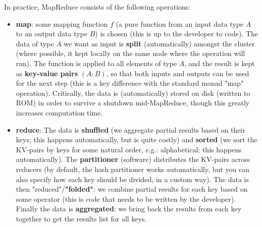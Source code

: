 \documentclass{article}
\begin{document}
\begin{itemize}
	In practice, MapReduce consists of the following operations:
	\begin{itemize}
		\item \textbf{map}: some mapping function $f$ (a pure function from an input data type $A$ to an output data type $B$) is chosen (this is up to the developer to code). The data of type $A$ we want as input is \textbf{split} (automatically) amongst the cluster (where possible, it kept locally on the same node where the operation will run). The function is applied to all elements of type $A$, and the result is kept as \textbf{key-value pairs} $(A : B)$, so that both inputs and outputs can be used for the next step (this is a key difference with the standard monad "map" operation). Critically, the data is (automatically) stored on disk (written to ROM) in order to survive a shutdown mid-MapReduce, though this greatly increases computation time.

		\item \textbf{reduce}: The data is \textbf{shuffled} (we aggregate partial results based on their keys; this happens automatically, but is quite costly) and \textbf{sorted} (we sort the KV-pairs by keys for some natural order, e.g.: alphabetical; this happens automatically). The \textbf{partitioner} (software) distributes the KV-pairs across reducers (by default, the hash partitioner works automatically, but you can also specify how each key should be divided, in a custom way). The data is then "reduced"/\textbf{"folded"}: we combine partial results for each key based on some operator (this is code that needs to be written by the developer). Finally the data is \textbf{aggregated}: we bring back the results from each key together to get the results list for all keys.
	\end{itemize}


\end{itemize}
\end{document}
